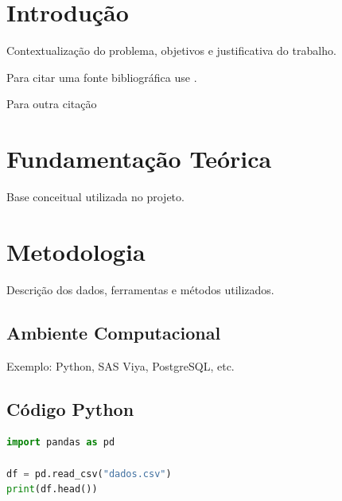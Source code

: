 \documentclass[
    12pt,
    oneside,
    a4paper,
    chapter=TITLE,
    section=TITLE
]{abntex2}
\begin{document}
\tableofcontents*
\listoffigures*
\listoftables*

\cleardoublepage
\pagestyle{fancy}
\textual

\chapter{Introdução}

Contextualização do problema, objetivos e justificativa do trabalho.

Para citar uma fonte bibliográfica use \cite{goodfellow2016}.

Para outra citação \cite{ibge2025}

\chapter{Fundamentação Teórica}

Base conceitual utilizada no projeto.

\chapter{Metodologia}

Descrição dos dados, ferramentas e métodos utilizados.

\section{Ambiente Computacional}

Exemplo: Python, SAS Viya, PostgreSQL, etc.

\section{Código Python}

\begin{lstlisting}[language=Python,caption={Exemplo em Python}]
import pandas as pd

df = pd.read_csv("dados.csv")
print(df.head())
\end{lstlisting}
\end{document}
